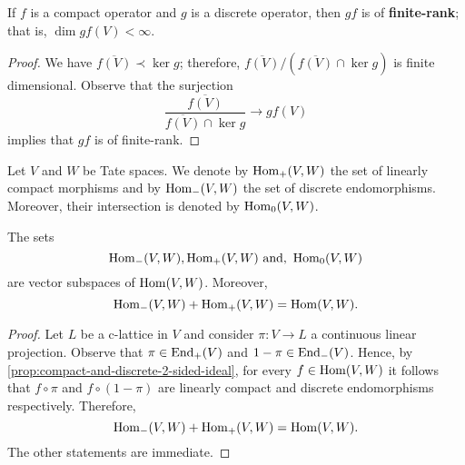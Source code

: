 \begin{remark}\label{rem:discrete-composition-compact}
If $f$ is a compact operator and $g$ is a discrete operator, then $gf$ is of \textbf{finite-rank}; that is, $\dim gf(V) < \infty$.  
\end{remark}
\begin{proof}
	We have $\overline{f(V)} \prec \ker g$; therefore, $\overline{f(V)}/(\overline{f(V)} \cap \ker g)$ is finite dimensional. Observe that the surjection
	\[
		\frac{\overline{f(V)}}{\overline{f(V)}\cap \ker g} \to gf(V)
	\]
	implies that $gf$ is of finite-rank.
\end{proof}
\begin{definition}\label{def:2-sided-ideals-in-hom}
	Let $V$ and $W$ be Tate spaces. We denote by $\operatorname{Hom}_{+}(V,W)$ the set of linearly compact morphisms and by $\operatorname{Hom}_{-}(V,W)$ the set of discrete endomorphisms. Moreover, their intersection is denoted by $\operatorname{Hom}_{0}(V,W)$.
\end{definition}
\begin{proposition}\label{prop:discrete-compact-operators-present-the-whole-space}
	The sets 
	\[
		\operatorname{Hom}_{-}(V,W), \operatorname{Hom}_{+}(V,W) \text{ and, } \operatorname{Hom}_{0}(V,W)
	\]
	are vector subspaces of $\operatorname{Hom}(V,W)$. Moreover,
	\[
		\operatorname{Hom}_{-}(V,W) + \operatorname{Hom}_{+}(V,W) = \operatorname{Hom}(V,W).
	\]
\end{proposition}
\begin{proof}
	Let $L$ be a c-lattice in $V$ and consider $\pi\colon V \to L$ a continuous linear projection. Observe that $\pi \in\operatorname{End}_{+}(V)$ and $1 -\pi\in\operatorname{End}_{-}(V)$. Hence, by \cref{prop:compact-and-discrete-2-sided-ideal}, for every $f\in \operatorname{Hom}(V,W)$ it follows that $f\circ \pi$ and $f\circ (1 - \pi)$ are linearly compact and discrete endomorphisms respectively. Therefore,
	\[
		\operatorname{Hom}_{-}(V,W) + \operatorname{Hom}_{+}(V,W) = \operatorname{Hom}(V,W).
	\]
	The other statements are immediate.
\end{proof}
